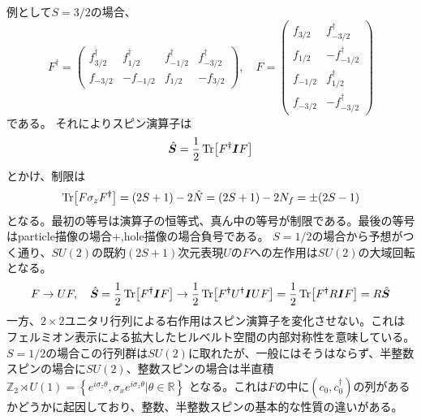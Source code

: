 \documentclass[11pt, aps, longbibliography]{article}
\begin{document}
        例として$S=3/2$の場合、
        \begin{equation}
            F^\dagger = \begin{pmatrix}
                f_{3/2}^\dagger & f_{1/2}^\dagger & f_{-1/2}^\dagger & f_{-3/2}^\dagger \\
                f_{-3/2} & -f_{-1/2} & f_{1/2} & -f_{3/2}
            \end{pmatrix}, \quad
            F = \begin{pmatrix}
                f_{3/2} & f_{-3/2}^\dagger \\ f_{1/2} & -f_{-1/2}^\dagger \\
                f_{-1/2} & f_{1/2}^\dagger \\ f_{-3/2} & -f_{-3/2}^\dagger
            \end{pmatrix}
        \end{equation}
        である。
        それによりスピン演算子は
        \begin{equation}\label{eq:highS-MF-6}
            \hat{\boldsymbol{S}} = \frac{1}{2}\Tr [F^\dagger \boldsymbol{I} F]
        \end{equation}
        とかけ、制限は
        \begin{equation}\label{eq:highS-MF-7}
            \Tr [F\sigma_zF^\dagger] = (2S+1) - 2\hat{N} = (2S+1) - 2N_f = \pm(2S-1)
        \end{equation}
        となる。最初の等号は演算子の恒等式、真ん中の等号が制限である。最後の等号はparticle描像の場合$+$,hole描像の場合負号である。
        $S=1/2$の場合から予想がつく通り、$SU(2)$の既約$(2S+1)$次元表現$U$の$F$への左作用は$SU(2)$の大域回転となる。
        \begin{equation}\label{eq:highS-MF-8}
            F \rightarrow UF, \quad \hat{\boldsymbol{S}} = \frac{1}{2}\Tr [F^\dagger \boldsymbol{I} F] \rightarrow \frac{1}{2}\Tr [F^\dagger U^\dagger \boldsymbol{I} UF] = \frac{1}{2}\Tr [F^\dagger R\boldsymbol{I} F] =R \hat{\boldsymbol{S}}
        \end{equation}
        一方、$2\times 2$ユニタリ行列による右作用はスピン演算子を変化させない。これはフェルミオン表示による拡大したヒルベルト空間の内部対称性を意味している。
        $S=1/2$の場合この行列群は$SU(2)$に取れたが、一般にはそうはならず、半整数スピンの場合に$SU(2)$、整数スピンの場合は半直積$\mathbb{Z}_2 \rtimes U(1) = \left\{e^{i\sigma_z \theta}, \sigma_xe^{i\sigma_z \theta} | \theta \in \mathbb{R} \right\}$
        となる。これは$F$の中に$(c_0, c_0^\dagger)$の列があるかどうかに起因しており、整数、半整数スピンの基本的な性質の違いがある。
\end{document}
